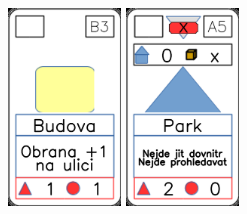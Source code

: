 \documentclass[a4paper]{article}
\begin{document}
	\includegraphics[width=3.0cm]{img-2_7}
	\includegraphics[width=3.0cm]{img-3_19}
\end{document}

